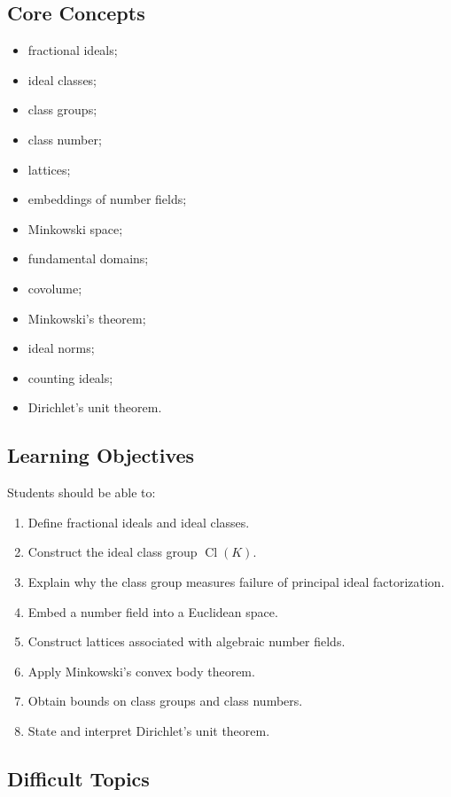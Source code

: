 \documentclass[11pt,a4paper]{article}
\newcommand{\Cl}{\operatorname{Cl}}
\begin{document}
\subsection{Core Concepts}

\begin{itemize}
    \item fractional ideals;
    \item ideal classes;
    \item class groups;
    \item class number;
    \item lattices;
    \item embeddings of number fields;
    \item Minkowski space;
    \item fundamental domains;
    \item covolume;
    \item Minkowski's theorem;
    \item ideal norms;
    \item counting ideals;
    \item Dirichlet's unit theorem.
\end{itemize}

\subsection{Learning Objectives}

Students should be able to:

\begin{enumerate}
    \item Define fractional ideals and ideal classes.
    \item Construct the ideal class group \(\Cl(K)\).
    \item Explain why the class group measures failure of
    principal ideal factorization.
    \item Embed a number field into a Euclidean space.
    \item Construct lattices associated with algebraic number fields.
    \item Apply Minkowski's convex body theorem.
    \item Obtain bounds on class groups and class numbers.
    \item State and interpret Dirichlet's unit theorem.
\end{enumerate}

\subsection{Difficult Topics}
\end{document}
